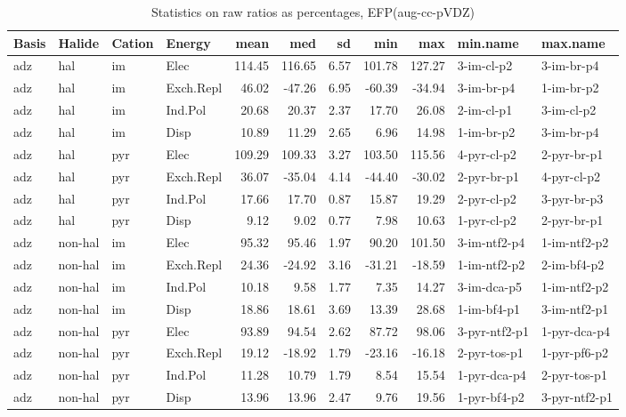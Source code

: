 \documentclass[a4paper]{article}
\begin{document}
\begin{table}[ht]
\centering
\begin{tabular}{llllrrrrrll}
  \hline
Basis & Halide & Cation & Energy & mean & med & sd & min & max & min.name & max.name \\ 
  \hline
adz & hal & im & Elec & 114.45 & 116.65 & 6.57 & 101.78 & 127.27 & 3-im-cl-p2 & 3-im-br-p4 \\ 
  adz & hal & im & Exch.Repl & 46.02 & -47.26 & 6.95 & -60.39 & -34.94 & 3-im-br-p4 & 1-im-br-p2 \\ 
  adz & hal & im & Ind.Pol & 20.68 & 20.37 & 2.37 & 17.70 & 26.08 & 2-im-cl-p1 & 3-im-cl-p2 \\ 
  adz & hal & im & Disp & 10.89 & 11.29 & 2.65 & 6.96 & 14.98 & 1-im-br-p2 & 3-im-br-p4 \\ 
  adz & hal & pyr & Elec & 109.29 & 109.33 & 3.27 & 103.50 & 115.56 & 4-pyr-cl-p2 & 2-pyr-br-p1 \\ 
  adz & hal & pyr & Exch.Repl & 36.07 & -35.04 & 4.14 & -44.40 & -30.02 & 2-pyr-br-p1 & 4-pyr-cl-p2 \\ 
  adz & hal & pyr & Ind.Pol & 17.66 & 17.70 & 0.87 & 15.87 & 19.29 & 2-pyr-cl-p2 & 3-pyr-br-p3 \\ 
  adz & hal & pyr & Disp & 9.12 & 9.02 & 0.77 & 7.98 & 10.63 & 1-pyr-cl-p2 & 2-pyr-br-p1 \\ 
  adz & non-hal & im & Elec & 95.32 & 95.46 & 1.97 & 90.20 & 101.50 & 3-im-ntf2-p4 & 1-im-ntf2-p2 \\ 
  adz & non-hal & im & Exch.Repl & 24.36 & -24.92 & 3.16 & -31.21 & -18.59 & 1-im-ntf2-p2 & 2-im-bf4-p2 \\ 
  adz & non-hal & im & Ind.Pol & 10.18 & 9.58 & 1.77 & 7.35 & 14.27 & 3-im-dca-p5 & 1-im-ntf2-p2 \\ 
  adz & non-hal & im & Disp & 18.86 & 18.61 & 3.69 & 13.39 & 28.68 & 1-im-bf4-p1 & 3-im-ntf2-p1 \\ 
  adz & non-hal & pyr & Elec & 93.89 & 94.54 & 2.62 & 87.72 & 98.06 & 3-pyr-ntf2-p1 & 1-pyr-dca-p4 \\ 
  adz & non-hal & pyr & Exch.Repl & 19.12 & -18.92 & 1.79 & -23.16 & -16.18 & 2-pyr-tos-p1 & 1-pyr-pf6-p2 \\ 
  adz & non-hal & pyr & Ind.Pol & 11.28 & 10.79 & 1.79 & 8.54 & 15.54 & 1-pyr-dca-p4 & 2-pyr-tos-p1 \\ 
  adz & non-hal & pyr & Disp & 13.96 & 13.96 & 2.47 & 9.76 & 19.56 & 1-pyr-bf4-p2 & 3-pyr-ntf2-p1 \\ 
   \hline
\end{tabular}
\caption{Statistics on raw ratios as percentages, EFP(aug-cc-pVDZ)}
\end{table}
\end{document}

